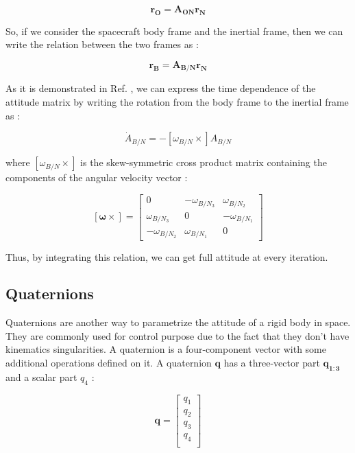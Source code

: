 \documentclass[11pt,a4paper]{report}
\begin{document}
\begin{equation}
 \mathbf{r_{O}} = \mathbf{A_{ON}} \mathbf{r_{N}}
\end{equation}

So, if we consider the spacecraft body frame and the inertial frame, then we can write the relation between the two frames as : 

\begin{equation}
 \mathbf{r_{B}} = \mathbf{A_{B/N}} \mathbf{r_{N}}
\end{equation}

As it is demonstrated in Ref. \cite{Ref:Books:Fundamentals}, we can express the time dependence of the attitude matrix by writing the rotation from the body frame to the inertial frame as : 

\begin{equation}
 \dot{A}_{B/N}= - [\omega_{B/N} \times]A_{B/N} 
\end{equation}

where $[\omega_{B/N} \times]$ is the skew-symmetric cross product matrix containing the components of the angular velocity vector : 

\begin{equation*}
 \mathbf{[\omega \times]} =
                                \begin{bmatrix}
                                    0 & -\omega_{B/N_{3}} & \omega_{B/N_{2}} \\
                                    \omega_{B/N_{3}} & 0 & -\omega_{B/N_{1}} \\
                                    -\omega_{B/N_{2}} & \omega_{B/N_{1}} & 0
                                \end{bmatrix}
\end{equation*}

Thus, by integrating this relation, we can get full attitude at every iteration.

\subsection{Quaternions}
Quaternions are another way to parametrize the attitude of a rigid body in space. They are commonly used for control purpose due to the fact that they don't have kinematics singularities.
A quaternion is a four-component vector with some additional operations defined on it. A quaternion $\mathbf{q}$ has a three-vector part $\mathbf{q_{1:3}}$ and a scalar part $q_{4}$ : 

\begin{equation*}
 \mathbf{q} =
                                \begin{bmatrix}
                                    q_{1}\\
                                    q_{2}\\
                                    q_{3}\\
                                    q_{4}\\
                                \end{bmatrix}
\end{equation*}
\end{document}
